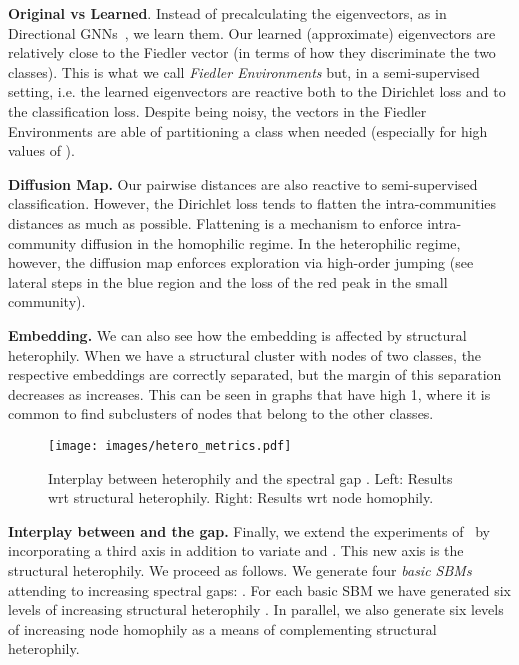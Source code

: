 \documentclass{article}
\theoremstyle{plain}
\theoremstyle{definition}
\begin{document}
\textbf{Original vs Learned}. Instead of precalculating the eigenvectors, as in Directional GNNs~\citep{beaini2021directional}, we learn them. Our learned (approximate) eigenvectors are relatively close to the Fiedler vector (in terms of how they discriminate the two classes). This is what we call \emph{Fiedler Environments} but, in a semi-supervised setting, i.e. the learned eigenvectors are reactive both to the Dirichlet loss and to the classification loss. Despite being noisy, the vectors in the Fiedler Environments are able of partitioning a class when needed (especially for high values of ). 
    
\textbf{Diffusion Map.}  Our pairwise distances are also reactive to semi-supervised classification. However, the Dirichlet loss tends to flatten the intra-communities distances as much as possible. Flattening is a mechanism to enforce intra-community diffusion in the homophilic regime. In the heterophilic regime, however, the diffusion map enforces exploration via high-order jumping (see lateral steps in the blue region and the loss of the red peak in the small community). 

\textbf{Embedding.} We can also see how the embedding is affected by structural heterophily. When we have a structural cluster with nodes of two classes, the respective embeddings are correctly separated, but the margin of this separation decreases as  increases. This can be seen in graphs that have high  1, where it is common to find subclusters of nodes that belong to the other classes.
\begin{figure*}[ht]
\begin{center}
\centerline{\texttt{[image: images/hetero\_metrics.pdf]}}
    \caption{Interplay between heterophily and the spectral gap . Left: Results wrt structural heterophily. Right: Results wrt node homophily.}
    \label{fig:sh-explain}
\end{center}
\end{figure*} 

\textbf{Interplay between  and the gap.} Finally, we extend the experiments of~\citep{ASGC} by incorporating a third axis in addition to variate  and . This new axis is the structural heterophily. 
We proceed as follows. We generate four \emph{basic SBMs} attending to increasing spectral gaps: . For each basic SBM we have generated six levels of increasing structural heterophily . In parallel, we also generate six levels of increasing node homophily as a means of complementing structural heterophily.
\end{document}
